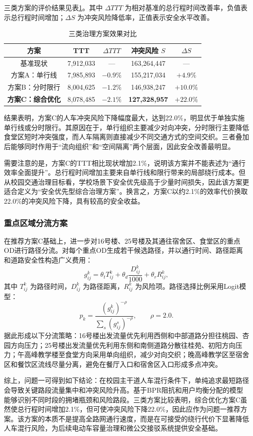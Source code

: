 \documentclass[UTF8,zihao=-4,a4paper]{ctexart}
\begin{document}
三类方案的评价结果见表\ref{tab:scenario_compare}。其中 $\Delta TTT$ 为相对基准的总行程时间改善率，负值表示总行程时间增加；$\Delta S$ 为冲突风险降低率，正值表示安全水平改善。

\begin{table}[H]
\centering
\caption{三类治理方案效果对比}
\label{tab:scenario_compare}
\begin{tabular}{ccccc}
\toprule
\textbf{方案} & \textbf{TTT} & \textbf{$\Delta TTT$} & \textbf{冲突风险 $S$} & \textbf{$\Delta S$} \\
\midrule
基准现状 & 7,912,033 & --- & 163,264,447 & --- \\
方案A：单行线 & 7,985,893 & $-0.9\%$ & 155,217,034 & $+4.9\%$ \\
方案B：分时限行 & 8,004,625 & $-1.2\%$ & 146,938,247 & $+10.0\%$ \\
\textbf{方案C：综合优化} & 8,078,485 & $-2.1\%$ & \textbf{127,328,957} & \textbf{$+22.0\%$} \\
\bottomrule
\end{tabular}
\end{table}

结果表明，方案C的人车冲突风险下降幅度最大，达到22.0\%，明显优于单独实施单行线或分时限行。其原因在于，单行组织主要减少对向冲突，分时限行主要降低食堂区短时冲突强度，而人车隔离则直接减少不同交通方式的空间交织。三者叠加后能够同时作用于“流向组织”和“空间隔离”两个层面，因此安全改善最明显。

需要注意的是，方案C的TTT相比现状增加2.1\%，说明该方案并不能表述为“通行效率全面提升”。总行程时间增加主要来自单行线和限行带来的局部绕行成本。但从校园交通治理目标看，学校场景下安全优先级高于少量时间损失，因此该方案更适合定义为“安全优先型综合治理方案”。换言之，方案C以约2.1\%的效率代价换取22.0\%的冲突风险下降，具有较高的安全收益。

\subsubsection{重点区域分流方案}

在推荐方案C基础上，进一步对16号楼、25号楼及其通往宿舍区、食堂区的重点OD进行路径分流。对每个重点OD生成若干候选路径，并以通行时间、路径距离和道路安全性构造广义费用：
\begin{equation}
g_{ij}^k=\theta_t T_{ij}^k+\theta_d\frac{D_{ij}^k}{1000}+\theta_r R_{ij}^k,
\end{equation}
其中 $T_{ij}^k$ 为路径时间，$D_{ij}^k$ 为路径距离，$R_{ij}^k$ 为风险项。路径选择比例采用Logit模型：
\begin{equation}
p_k=\frac{(g_{ij}^k)^{-\rho}}{\sum_s(g_{ij}^s)^{-\rho}},\qquad \rho=2.0.
\end{equation}
据此形成以下分流策略：16号楼出发流量优先利用西侧和中部道路分担往桃园、杏园方向压力；25号楼出发流量优先利用东侧和南侧道路分散往桂苑、初阳方向压力；午高峰教学楼至食堂方向采用单向组织，减少对向交织；晚高峰教学区至宿舍区和餐饮区流线尽量分离，避免在餐厅入口和宿舍区入口形成多点冲突。

综上，问题一可得到如下结论：在校园主干道人车混行条件下，单纯追求最短路径会导致关键路段流量集中和冲突风险升高。基于BPR阻抗和用户均衡分配的模型能够识别不同时段的拥堵瓶颈和风险路段。三类方案比较表明，综合优化方案C虽然使总行程时间增加2.1\%，但可使冲突风险下降22.0\%，因此应作为问题一推荐方案。该方案的本质不是提高全路网通行速度，而是在可接受的绕行代价下显著降低人车混行风险，为后续电动车容量治理和微公交接驳系统提供安全基础。
\end{document}
